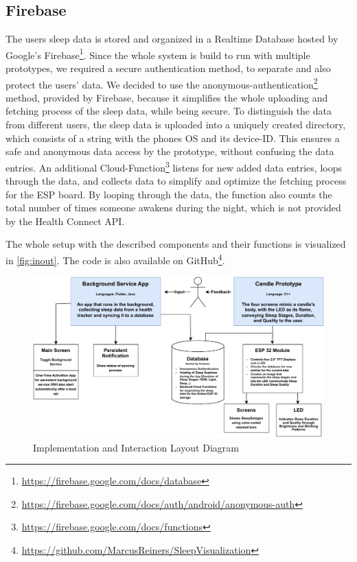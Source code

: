 \documentclass[
  a4paper,  %
  twoside,  %
  bibliography=totoc,
  headsepline,
  cleardoublepage=empty,
  parskip=half,
  draft=false
]{scrbook}
\begin{document}
\subsection{Firebase}
The users sleep data is stored and organized in a Realtime Database hosted by Google's Firebase\footnote{\url{https://firebase.google.com/docs/database}}. Since the whole system is build to run with multiple prototypes, we required a secure authentication method, to separate and also protect the users' data. We decided to use the anonymous-authentication\footnote{\url{https://firebase.google.com/docs/auth/android/anonymous-auth}} method, provided by Firebase, because it simplifies the whole uploading and fetching process of the sleep data, while being secure. To distinguish the data from different users, the sleep data is uploaded into a uniquely created directory, which consists of a string with the phones OS and its device-ID. This ensures a safe and anonymous data access by the prototype, without confusing the data entries. An additional Cloud-Function\footnote{\url{https://firebase.google.com/docs/functions}} listens for new added data entries, loops through the data, and collects data to simplify and optimize the fetching process for the ESP board. By looping through the data, the function also counts the total number of times someone awakens during the night, which is not provided by the Health Connect API.

The whole setup with the described components and their functions is visualized in \autoref{fig:inout}. The code
is also available on GitHub\footnote{\url{https://github.com/MarcusReiners/SleepVisualization}}.


\begin{figure}[H]
    \centering
    \includegraphics[height=\paperheight, width=\paperwidth, angle=90, keepaspectratio]{graphics/InputOutput.drawio (3).pdf}
    \caption{Implementation and Interaction Layout Diagram}
    \label{fig:inout}
\end{figure}
\end{document}
